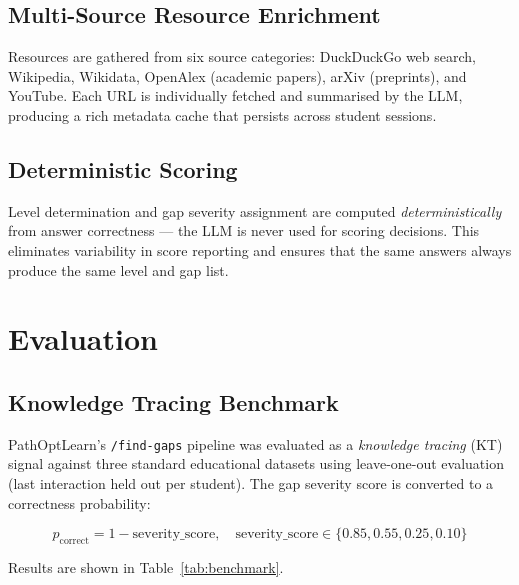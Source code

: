 \documentclass[12pt,a4paper]{article}
\begin{document}
\subsection{Multi-Source Resource Enrichment}

Resources are gathered from six source categories: DuckDuckGo web search,
Wikipedia, Wikidata, OpenAlex (academic papers), arXiv (preprints), and
YouTube. Each URL is individually fetched and summarised by the LLM,
producing a rich metadata cache that persists across student sessions.

\subsection{Deterministic Scoring}

Level determination and gap severity assignment are computed
\emph{deterministically} from answer correctness — the LLM is never used
for scoring decisions. This eliminates variability in score reporting and
ensures that the same answers always produce the same level and gap list.

\section{Evaluation}

\subsection{Knowledge Tracing Benchmark}

PathOptLearn's \texttt{/find-gaps} pipeline was evaluated as a
\emph{knowledge tracing} (KT) signal against three standard educational
datasets using leave-one-out evaluation (last interaction held out per
student). The gap severity score is converted to a correctness probability:

\[
  p_{\text{correct}} = 1 - \text{severity\_score},
  \quad \text{severity\_score} \in \{0.85, 0.55, 0.25, 0.10\}
\]

Results are shown in Table~\ref{tab:benchmark}.
\end{document}
